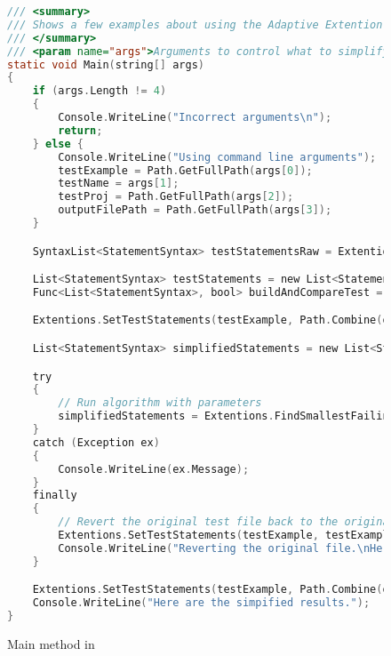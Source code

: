 
\label{Main Method}

\begin{figure}
\begin{lstlisting}[language=C]
/// <summary>
/// Shows a few examples about using the Adaptive Extention methods
/// </summary>
/// <param name="args">Arguments to control what to simplify; (Path to test, name of test, path to testProj, output path)</param>
static void Main(string[] args)
{
	if (args.Length != 4)
	{
		Console.WriteLine("Incorrect arguments\n");
		return;
	} else {
		Console.WriteLine("Using command line arguments");
		testExample = Path.GetFullPath(args[0]);
		testName = args[1];
		testProj = Path.GetFullPath(args[2]);
		outputFilePath = Path.GetFullPath(args[3]);
	}

	SyntaxList<StatementSyntax> testStatementsRaw = Extentions.GetTestStatements(testExample, testName);

	List<StatementSyntax> testStatements = new List<StatementSyntax>(testStatementsRaw);
	Func<List<StatementSyntax>, bool> buildAndCompareTest = BuildAndRunTest;

	Extentions.SetTestStatements(testExample, Path.Combine(outputFilePath, "Original", testName + "_" + Path.GetFileName(testExample)), testName, testStatements);

	List<StatementSyntax> simplifiedStatements = new List<StatementSyntax>();

	try
	{
		// Run algorithm with parameters
		simplifiedStatements = Extentions.FindSmallestFailingInput<StatementSyntax>(testStatements, buildAndCompareTest);
	}
	catch (Exception ex)
	{
		Console.WriteLine(ex.Message);
	}
	finally
	{
		// Revert the original test file back to the original form
		Extentions.SetTestStatements(testExample, testExample, testName, testStatements);
		Console.WriteLine("Reverting the original file.\nHere is the original file");
	}

	Extentions.SetTestStatements(testExample, Path.Combine(outputFilePath, "Simplified", testName + "_" + Path.GetFileName(testExample)), testName, simplifiedStatements);
	Console.WriteLine("Here are the simpified results.");
}
\end{lstlisting}
\caption{Main method in \mytool}
\label{fig:Main1}
\end{figure}